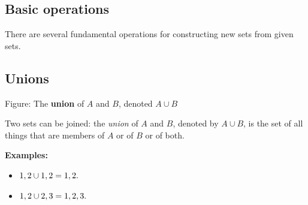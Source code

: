 \subsection{Basic operations}
\label{sss:basi-a79a}




There are several fundamental operations for constructing new sets from given sets.




\subsection{Unions}
\label{sss:unio-9205}







Figure: The \textbf{union} of $A$ and $B$, denoted $A \cup B$



Two sets can be joined: the \textit{union} of $A$ and $B$, denoted by $A \cup B$, is the
set of all things that are members of $A$ or of $B$ or of both.



\textbf{Examples:}



\begin{itemize}
    \item $ \\{1, 2\\} \cup \\{1, 2\\} = \\{1, 2\\}.$
\end{itemize}

\begin{itemize}
    \item $ \\{1, 2\\} \cup \\{2, 3\\} = \\{1, 2, 3\\}.$
\end{itemize}

